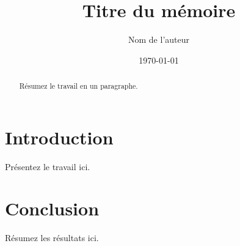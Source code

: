 \documentclass[12pt]{report}
\title{Titre du mémoire}
\author{Nom de l'auteur}
\date{\today}
\begin{document}
\maketitle

\begin{abstract}
Résumez le travail en un paragraphe.
\end{abstract}

\tableofcontents

\chapter{Introduction}
Présentez le travail ici.

\chapter{Conclusion}
Résumez les résultats ici.
\end{document}

